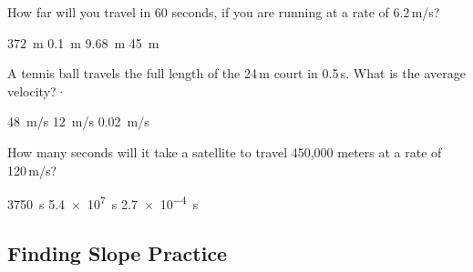 \documentclass[answers]{exam}
\begin{document}
\begin{questions}
\question
How far will you travel in 60 seconds, if you are running at a rate of 6.2\,m/s?

\begin{randomizechoices}
    \correctchoice \SI{372}{m}
    \choice \SI{0.1}{m}
    \choice \SI{9.68}{m}
    \choice \SI{45}{m}
\end{randomizechoices}

\question
A tennis ball travels the full length of the 24\,m court in 0.5\,s. What is the average velocity?·

\begin{randomizechoices}
    \correctchoice \SI{48}{m/s}
    \choice \SI{12}{m/s}
    \choice \SI{0.02}{m/s}
\end{randomizechoices}

\question
How many seconds will it take a satellite to travel 450,000 meters at a rate of 120\,m/s?

\begin{randomizechoices}
    \correctchoice \SI{3750}{s}
    \choice \SI{5.4e7}{s}
    \choice \SI{2.7e-4}{s}
\end{randomizechoices}
\end{questions}

\clearpage

\subsection{Finding Slope Practice}
\end{document}
